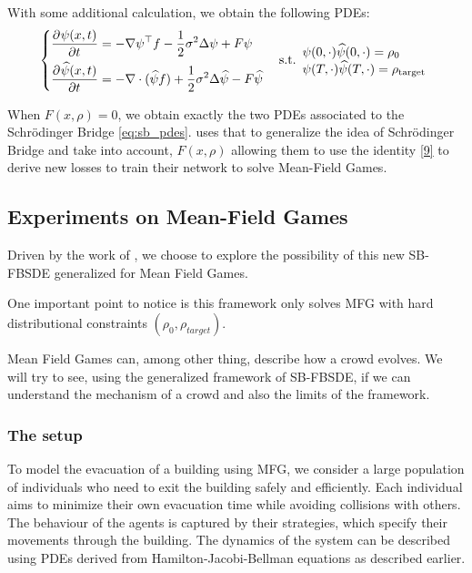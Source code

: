 \documentclass{article}
\begin{document}
With some additional calculation, we obtain the following PDEs:
\begin{equation}
    \begin{cases}
        \displaystyle \frac{\partial^{}\psi(x, t)}{\partial {t}^{}}
        = - \nabla \psi^\top f
        - \frac{1}{2} \sigma^2 \Delta \psi
        + F \psi \\[7pt]
        \displaystyle \frac{\partial^{}\widehat\psi(x, t)}{\partial {t}^{}}
        = - \nabla \cdot (\widehat\psi f)
        + \frac{1}{2} \sigma^2 \Delta \widehat\psi
        - F \widehat\psi
    \end{cases}
    \mathrm{s.t.}
    \begin{array}{l}
        \psi(0, \cdot) \widehat{\psi}(0, \cdot)= \rho_0 \\
        \psi(T, \cdot) \widehat{\psi}(T, \cdot)= \rho_{\rm target}
    \end{array}
\end{equation}

When $F(x, \rho) = 0$, we obtain exactly the two PDEs associated to the Schrödinger Bridge \eqref{eq:sb_pdes}.
\cite{liu2022deep} uses that to generalize the idea of Schrödinger Bridge and take into account, $F(x, \rho)$ allowing them to use the identity \eqref{9} to derive new losses to train their network to solve Mean-Field Games.


\subsection{Experiments on Mean-Field Games}

Driven by the work of \cite{liu2022deep}, we choose to explore the possibility of this new SB-FBSDE generalized for Mean Field Games.

One important point to notice is this framework only solves MFG with hard distributional constraints
$(\rho_0, \rho_{target})$.

Mean Field Games can, among other thing, describe how a crowd evolves. We will try to see, using the generalized framework of SB-FBSDE, if we can understand the mechanism of a crowd and also the limits of the framework.


\subsubsection{The setup}

To model the evacuation of a building using MFG, we consider a large population of individuals who need to exit the building safely and efficiently. Each individual aims to minimize their own evacuation time while avoiding collisions with others. The behaviour of the agents is captured by their strategies, which specify their movements through the building. The dynamics of the system can be described using PDEs derived from Hamilton-Jacobi-Bellman equations as described earlier.
\end{document}
